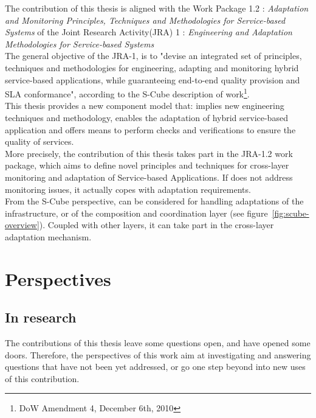 The contribution of this thesis is aligned with the Work Package 1.2 : {\it Adaptation and Monitoring Principles, Techniques and Methodologies for Service-based Systems} of the Joint Research Activity(JRA) 1 : {\it Engineering and Adaptation Methodologies for Service-based Systems}\\

The general objective of the JRA-1, is to "devise an integrated set of principles, techniques and methodologies for engineering, adapting and monitoring hybrid service-based applications, while guaranteeing end-to-end quality provision and SLA conformance", according to the S-Cube description of work\footnote{DoW Amendment 4, December 6th, 2010}.\\
This thesis provides a new component model that: implies new engineering techniques and methodology, enables the adaptation of hybrid service-based application and offers means to perform checks and verifications to ensure the quality of services.\\

More precisely, the contribution of this thesis takes part in the JRA-1.2 work package, which aims to define novel principles and techniques for cross-layer monitoring and adaptation of Service-based Applications. If \enti{} does not address monitoring issues, it actually copes with adaptation requirements.\\

From the S-Cube perspective, \enti{} can be considered for handling adaptations of the infrastructure, or of the composition and coordination layer (see figure~\ref{fig:scube-overview}). Coupled with other layers, it can take part in the cross-layer adaptation mechanism.






\chapter{Perspectives}
\section{In research}

The contributions of this thesis leave some questions open, and have opened some doors. Therefore, the perspectives of this work aim at investigating and answering questions that have not been yet addressed, or go one step beyond into new uses of this contribution.


